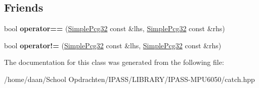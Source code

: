 \subsection*{Friends}
\begin{DoxyCompactItemize}
\item 
\mbox{\label{classCatch_1_1SimplePcg32_a3f1e143181b91f902ce034e2878f87eb}} 
bool {\bfseries operator==} (\hyperlink{classCatch_1_1SimplePcg32}{Simple\+Pcg32} const \&lhs, \hyperlink{classCatch_1_1SimplePcg32}{Simple\+Pcg32} const \&rhs)
\item 
\mbox{\label{classCatch_1_1SimplePcg32_a4940863fe85f6c5a2fa9b3910bfb7406}} 
bool {\bfseries operator!=} (\hyperlink{classCatch_1_1SimplePcg32}{Simple\+Pcg32} const \&lhs, \hyperlink{classCatch_1_1SimplePcg32}{Simple\+Pcg32} const \&rhs)
\end{DoxyCompactItemize}


The documentation for this class was generated from the following file\+:\begin{DoxyCompactItemize}
\item 
/home/daan/\+School Opdrachten/\+I\+P\+A\+S\+S/\+L\+I\+B\+R\+A\+R\+Y/\+I\+P\+A\+S\+S-\/\+M\+P\+U6050/catch.\+hpp\end{DoxyCompactItemize}
